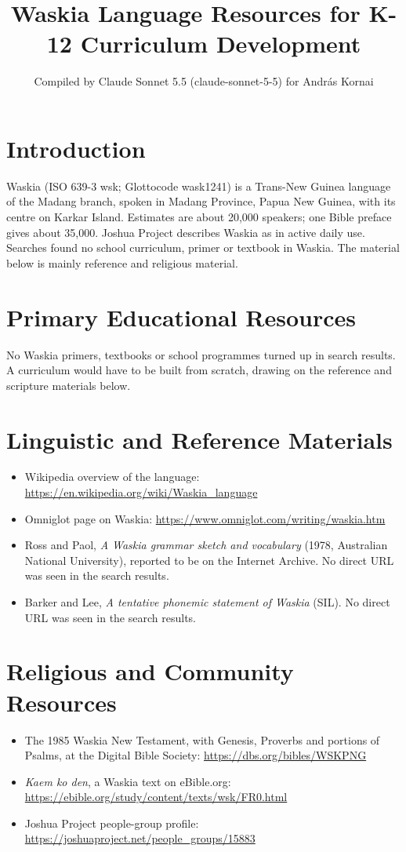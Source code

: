 \documentclass[12pt]{article}
\title{Waskia Language Resources for K-12 Curriculum Development}
\author{Compiled by Claude Sonnet 5.5 (claude-sonnet-5-5) for Andr\'as Kornai}
\date{}
\begin{document}
\maketitle

\section{Introduction}
Waskia (ISO 639-3 wsk; Glottocode wask1241) is a Trans-New Guinea language of the Madang branch, spoken in Madang Province, Papua New Guinea, with its centre on Karkar Island. Estimates are about 20,000 speakers; one Bible preface gives about 35,000. Joshua Project describes Waskia as in active daily use. Searches found no school curriculum, primer or textbook in Waskia. The material below is mainly reference and religious material.

\section{Primary Educational Resources}
No Waskia primers, textbooks or school programmes turned up in search results. A curriculum would have to be built from scratch, drawing on the reference and scripture materials below.

\section{Linguistic and Reference Materials}
\begin{itemize}
\item Wikipedia overview of the language: \url{https://en.wikipedia.org/wiki/Waskia_language}
\item Omniglot page on Waskia: \url{https://www.omniglot.com/writing/waskia.htm}
\item Ross and Paol, \emph{A Waskia grammar sketch and vocabulary} (1978, Australian National University), reported to be on the Internet Archive. No direct URL was seen in the search results.
\item Barker and Lee, \emph{A tentative phonemic statement of Waskia} (SIL). No direct URL was seen in the search results.
\end{itemize}

\section{Religious and Community Resources}
\begin{itemize}
\item The 1985 Waskia New Testament, with Genesis, Proverbs and portions of Psalms, at the Digital Bible Society: \url{https://dbs.org/bibles/WSKPNG}
\item \emph{Kaem ko den}, a Waskia text on eBible.org: \url{https://ebible.org/study/content/texts/wsk/FR0.html}
\item Joshua Project people-group profile: \url{https://joshuaproject.net/people_groups/15883}
\end{itemize}
\end{document}
